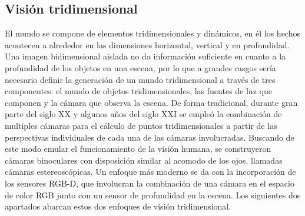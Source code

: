 \subsection{Visión tridimensional}
El mundo se compone de elementos tridimensionales y dinámicos, en él los hechos acontecen a alrededor en las dimensiones horizontal, vertical y en profundidad. Una imagen bidimensional aislada no da información suficiente en cuanto a la profundidad de los objetos en una escena, por lo que a grandes rasgos sería necesario definir la generación de un mundo tridimensional a través de tres componentes: el mundo de objetos tridimensionales, las fuentes de luz que componen y la cámara que observa la escena. De forma tradicional, durante gran parte del siglo XX y algunos años del siglo XXI se empleó la combinación de multiples cámaras para el cálculo de puntos tridimensionales a partir de las perspectivas individuales de cada una de las cámaras involucradas. Buscando de este modo emular el funcionamiento de la visión humana, se construyeron cámaras binoculares con disposición similar al acomodo de los ojos,  llamadas cámaras estereoscópicas. Un enfoque más moderno se da con la incorporación de los sensores RGB-D, que involucran la combinación de una cámara en el espacio de color RGB junto con un sensor de profundidad en la escena. Los siguientes dos apartados abarcan estos dos enfoques de visión tridimensional.
